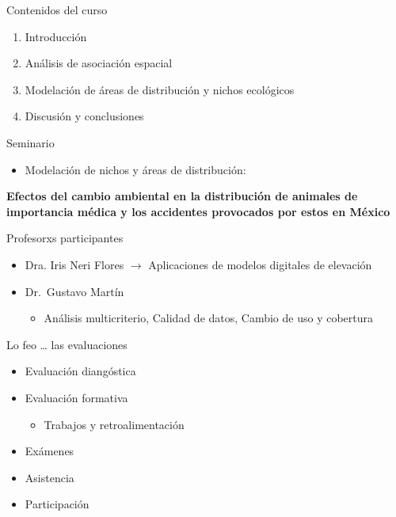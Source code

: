 \documentclass[
  11pt,
  ignorenonframetext,
]{beamer}
\providecommand{\tightlist}{%
  \setlength{\itemsep}{0pt}\setlength{\parskip}{0pt}}
\begin{document}
\begin{frame}{Contenidos del curso}
\protect\hypertarget{contenidos-del-curso}{}
\begin{enumerate}
\tightlist
\item
  Introducción
\item
  Análisis de asociación espacial
\item
  Modelación de áreas de distribución y nichos ecológicos
\item
  Discusión y conclusiones
\end{enumerate}
\end{frame}

\begin{frame}{Seminario}
\protect\hypertarget{seminario}{}
\begin{itemize}
\tightlist
\item
  Modelación de nichos y áreas de distribución:
\end{itemize}

\textbf{Efectos del cambio ambiental en la distribución de animales de
importancia médica y los accidentes provocados por estos en México}
\end{frame}

\begin{frame}{Profesorxs participantes}
\protect\hypertarget{profesorxs-participantes}{}
\begin{itemize}
\item
  Dra. Iris Neri Flores \(\rightarrow\) Aplicaciones de modelos
  digitales de elevación
\item
  Dr.~Gustavo Martín

  \begin{itemize}
  \tightlist
  \item
    Análisis multicriterio, Calidad de datos, Cambio de uso y cobertura
  \end{itemize}
\end{itemize}
\end{frame}

\begin{frame}{Lo feo \ldots{} las evaluaciones}
\protect\hypertarget{lo-feo-las-evaluaciones}{}
\begin{itemize}
\item
  Evaluación diangóstica
\item
  Evaluación formativa

  \begin{itemize}
  \tightlist
  \item
    Trabajos y retroalimentación
  \end{itemize}
\item
  Exámenes
\item
  Asistencia
\item
  Participación
\end{itemize}
\end{frame}
\end{document}

